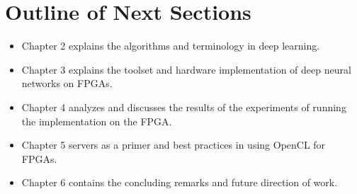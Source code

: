 
\section{Outline of Next Sections}

\begin{itemize}

\item Chapter 2 explains the algorithms and terminology in deep learning. 

\item Chapter 3 explains the toolset and hardware implementation of deep neural networks on FPGAs.

\item Chapter 4 analyzes and discusses the results of the experiments of running the implementation on the FPGA.

\item Chapter 5 servers as a primer and best practices in using OpenCL for FPGAs.

\item Chapter 6 contains the concluding remarks and future direction of work.

\end{itemize}



